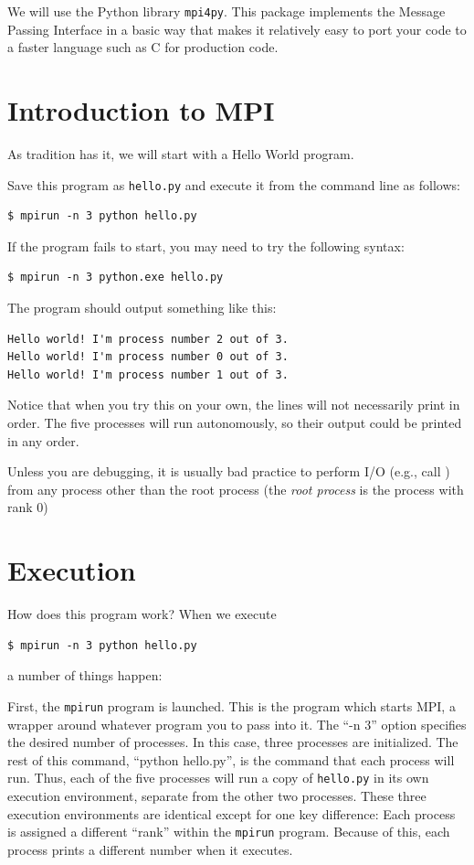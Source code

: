We will use the Python library \texttt{mpi4py}. This package implements the
Message Passing Interface in a basic way that makes it relatively easy to port
your code to a faster language such as C for production code.

\section*{Introduction to MPI}
As tradition has it, we will start with a Hello World program.

Save this program as \texttt{hello.py} and execute it from the command line as follows:
\begin{lstlisting}[style=ShellInput]
$ mpirun -n 3 python hello.py
\end{lstlisting}
\begin{info}
If the program fails to start, you may need to try the following syntax:
\begin{lstlisting}[style=ShellInput]
$ mpirun -n 3 python.exe hello.py
\end{lstlisting}
\end{info}
The program should output something like this:
\begin{lstlisting}[style=ShellOutput]
Hello world! I'm process number 2 out of 3.
Hello world! I'm process number 0 out of 3.
Hello world! I'm process number 1 out of 3.
\end{lstlisting}

Notice that when you try this on your own, the lines will not necessarily print
in order. The five processes will run autonomously, so their output could be
printed in any order.

\begin{warn}
Unless you are debugging, it is usually bad practice to perform I/O (e.g., call
) from any process other than the root process (the \emph{root
process} is the process with rank 0)
\end{warn}

\section*{Execution}
How does this program work? When we execute
\begin{lstlisting}[style=ShellInput]
$ mpirun -n 3 python hello.py
\end{lstlisting}
a number of things happen:

First, the \texttt{mpirun} program is launched. This is the program which starts
MPI, a wrapper around whatever program you to pass into it. The ``-n 3'' option
specifies the desired number of processes. In this case, three processes are
initialized. The rest of this command, ``python hello.py'', is the command that
each process will run. Thus, each of the five processes will run a copy of
\texttt{hello.py} in its own execution environment, separate from the other two
processes. These three execution environments are identical except for one key
difference: Each process is assigned a different ``rank'' within the
\texttt{mpirun} program. Because of this, each process prints a different number
when it executes.


